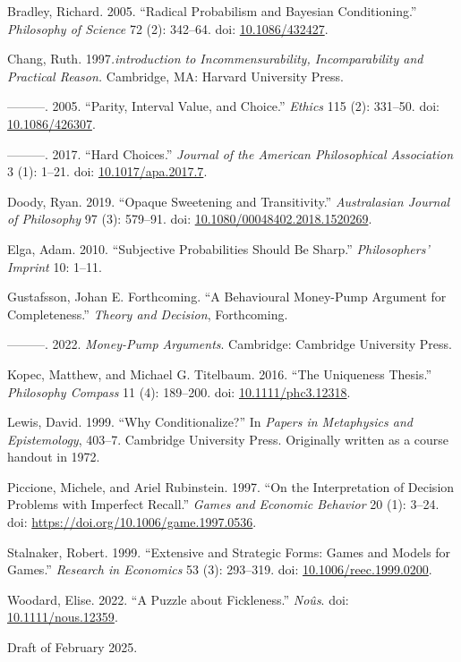 \documentclass[
  11pt,
  letterpaper,
  DIV=11,
  numbers=noendperiod,
  twoside]{scrartcl}
\newlength{\cslhangindent}
\newenvironment{CSLReferences}[2] %
 {\begin{list}{}{%
  \setlength{\itemindent}{0pt}
  \setlength{\leftmargin}{0pt}
  \setlength{\parsep}{0pt}
  \ifodd #1
   \setlength{\leftmargin}{\cslhangindent}
   \setlength{\itemindent}{-1\cslhangindent}
  \fi
  \setlength{\itemsep}{#2\baselineskip}}}
 {\end{list}}
\begin{document}
\label{refs}
\begin{CSLReferences}{1}{0}
Bradley, Richard. 2005. {``Radical Probabilism and Bayesian
Conditioning.''} \emph{Philosophy of Science} 72 (2): 342--64. doi:
\href{https://doi.org/10.1086/432427}{10.1086/432427}.

Chang, Ruth. 1997\emph{.introduction to Incommensurability,
Incomparability and Practical Reason.} Cambridge, MA: Harvard University
Press.

---------. 2005. {``Parity, Interval Value, and Choice.''} \emph{Ethics}
115 (2): 331--50. doi:
\href{https://doi.org/10.1086/426307}{10.1086/426307}.

---------. 2017. {``Hard Choices.''} \emph{Journal of the American
Philosophical Association} 3 (1): 1--21. doi:
\href{https://doi.org/10.1017/apa.2017.7}{10.1017/apa.2017.7}.

Doody, Ryan. 2019. {``Opaque Sweetening and Transitivity.''}
\emph{Australasian Journal of Philosophy} 97 (3): 579--91. doi:
\href{https://doi.org/10.1080/00048402.2018.1520269}{10.1080/00048402.2018.1520269}.

Elga, Adam. 2010. {``Subjective Probabilities Should Be Sharp.''}
\emph{Philosophers' Imprint} 10: 1--11.

Gustafsson, Johan E. Forthcoming. {``A Behavioural Money-Pump Argument
for Completeness.''} \emph{Theory and Decision}, Forthcoming.

---------. 2022. \emph{Money-Pump Arguments}. Cambridge: Cambridge
University Press.

Kopec, Matthew, and Michael G. Titelbaum. 2016. {``The Uniqueness
Thesis.''} \emph{Philosophy Compass} 11 (4): 189--200. doi:
\href{https://doi.org/10.1111/phc3.12318}{10.1111/phc3.12318}.

Lewis, David. 1999. {``Why Conditionalize?''} In \emph{Papers in
Metaphysics and Epistemology}, 403--7. Cambridge University Press.
Originally written as a course handout in 1972.

Piccione, Michele, and Ariel Rubinstein. 1997. {``On the Interpretation
of Decision Problems with Imperfect Recall.''} \emph{Games and Economic
Behavior} 20 (1): 3--24. doi:
\url{https://doi.org/10.1006/game.1997.0536}.

Stalnaker, Robert. 1999. {``Extensive and Strategic Forms: Games and
Models for Games.''} \emph{Research in Economics} 53 (3): 293--319. doi:
\href{https://doi.org/10.1006/reec.1999.0200}{10.1006/reec.1999.0200}.

Woodard, Elise. 2022. {``A Puzzle about Fickleness.''} \emph{No{û}s}.
doi: \href{https://doi.org/10.1111/nous.12359}{10.1111/nous.12359}.

\end{CSLReferences}



\noindent Draft of February 2025.
\end{document}
